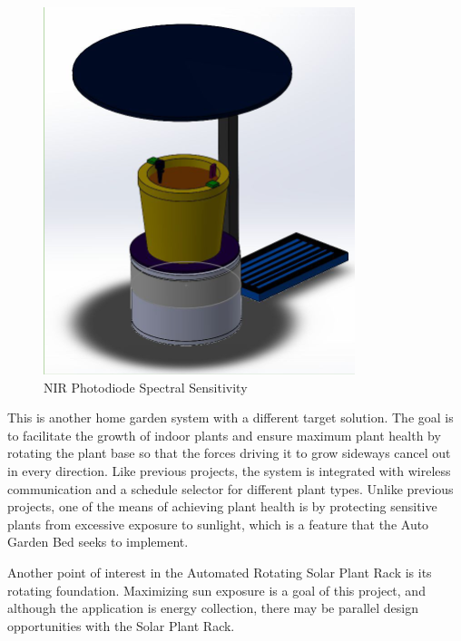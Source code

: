 \begin{figure}[H]
    \caption{NIR Photodiode Spectral Sensitivity}
    \centering
    \includegraphics[width=\textwidth]{images/3.1.4Pic.png}
\end{figure}

This is another home garden system with a different target solution. The goal is to facilitate the growth of indoor plants and ensure maximum plant health by rotating the plant base so that the forces driving it to grow sideways cancel out in every direction. Like previous projects, the system is integrated with wireless communication and a schedule selector for different plant types. Unlike previous projects, one of the means of achieving plant health is by protecting sensitive plants from excessive exposure to sunlight, which is a feature that the Auto Garden Bed seeks to implement. 

Another point of interest in the Automated Rotating Solar Plant Rack is its rotating foundation. Maximizing sun exposure is a goal of this project, and although the application is energy collection, there may be parallel design opportunities with the Solar Plant Rack.


